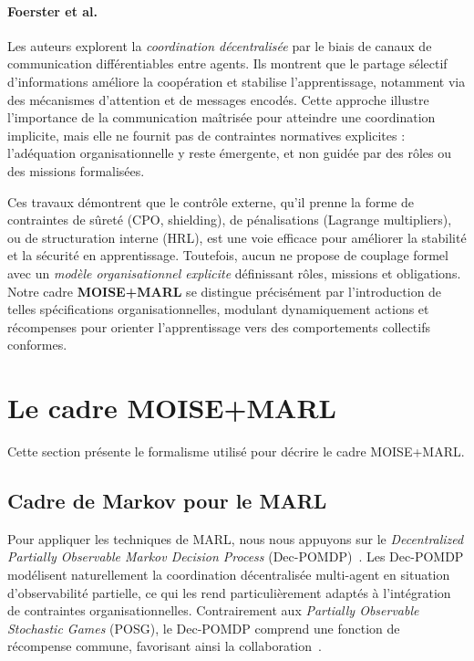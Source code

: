 \documentclass[francais,ROIA,Unicode,manuscript]{cedram}
\begin{document}
\paragraph{Foerster et al.~\cite{foerster2018communication}}
Les auteurs explorent la \emph{coordination décentralisée} par le biais de canaux de communication différentiables entre agents. Ils montrent que le partage sélectif d’informations améliore la coopération et stabilise l’apprentissage, notamment via des mécanismes d’attention et de messages encodés. Cette approche illustre l’importance de la communication maîtrisée pour atteindre une coordination implicite, mais elle ne fournit pas de contraintes normatives explicites : l’adéquation organisationnelle y reste émergente, et non guidée par des rôles ou des missions formalisées.

\medskip
\noindent
Ces travaux démontrent que le contrôle externe, qu’il prenne la forme de contraintes de sûreté (CPO, shielding), de pénalisations (Lagrange multipliers), ou de structuration interne (HRL), est une voie efficace pour améliorer la stabilité et la sécurité en apprentissage. Toutefois, aucun ne propose de couplage formel avec un \emph{modèle organisationnel explicite} définissant rôles, missions et obligations. Notre cadre \textbf{MOISE+MARL} se distingue précisément par l’introduction de telles spécifications organisationnelles, modulant dynamiquement actions et récompenses pour orienter l’apprentissage vers des comportements collectifs conformes.


\section{Le cadre MOISE+MARL}
\label{sec:moise_marl_framework}

Cette section présente le formalisme utilisé pour décrire le cadre MOISE+MARL.

\subsection{Cadre de Markov pour le MARL}

Pour appliquer les techniques de MARL, nous nous appuyons sur le \textit{Decentralized Partially Observable Markov Decision Process} (Dec-POMDP)~\cite{Oliehoek2016}. Les Dec-POMDP modélisent naturellement la coordination décentralisée multi-agent en situation d'observabilité partielle, ce qui les rend particulièrement adaptés à l'intégration de contraintes organisationnelles. Contrairement aux \textit{Partially Observable Stochastic Games} (POSG), le Dec-POMDP comprend une fonction de récompense commune, favorisant ainsi la collaboration~\cite{Beynier2013}.
\end{document}
